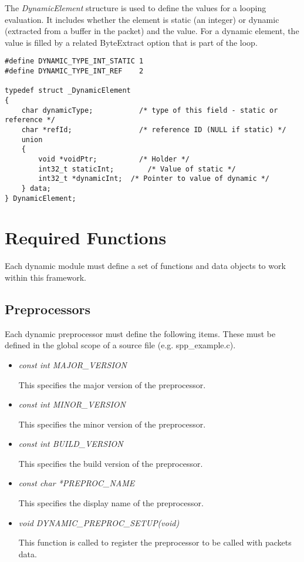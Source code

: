 \documentclass[english]{report}
\begin{document}
\begin{itemize}
The {\em DynamicElement} structure is used to define the values for a looping
evaluation.  It includes whether the element is static (an integer) or dynamic
(extracted from a buffer in the packet) and the value.  For a dynamic element,
the value is filled by a related ByteExtract option that is part of the loop.

\begin{verbatim}
#define DYNAMIC_TYPE_INT_STATIC 1
#define DYNAMIC_TYPE_INT_REF    2

typedef struct _DynamicElement
{
    char dynamicType;           /* type of this field - static or reference */
    char *refId;                /* reference ID (NULL if static) */
    union
    {
        void *voidPtr;          /* Holder */
        int32_t staticInt;        /* Value of static */
        int32_t *dynamicInt;  /* Pointer to value of dynamic */
    } data;
} DynamicElement;
\end{verbatim}

\end{itemize}

\section{Required Functions}

Each dynamic module must define a set of functions and data objects to work
within this framework.

\subsection{Preprocessors}

Each dynamic preprocessor must define the following items.  These must be defined
in the global scope of a source file (e.g. spp\_example.c).

\begin{itemize}
\item {\em const int MAJOR\_VERSION}

This specifies the major version of the preprocessor.

\item {\em const int MINOR\_VERSION}

This specifies the minor version of the preprocessor.

\item {\em const int BUILD\_VERSION}

This specifies the build version of the preprocessor.

\item {\em const char *PREPROC\_NAME}

This specifies the display name of the preprocessor.

\item {\em void DYNAMIC\_PREPROC\_SETUP(void)}

This function is called to register the preprocessor to be called with packets data.

\end{itemize}
\end{document}
